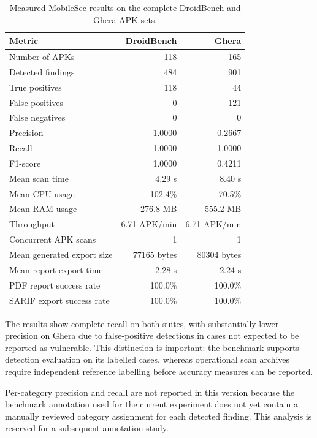 \begin{table}[!htbp]
\centering
\caption{Measured MobileSec results on the complete DroidBench and Ghera APK sets.}
\label{tab:mobilesec-benchmark-realworld-generated}
\begin{tabular}{lrr}
\toprule
\textbf{Metric} & \textbf{DroidBench} & \textbf{Ghera} \\
\midrule
Number of APKs & 118 & 165 \\
Detected findings & 484 & 901 \\
True positives & 118 & 44 \\
False positives & 0 & 121 \\
False negatives & 0 & 0 \\
Precision & 1.0000 & 0.2667 \\
Recall & 1.0000 & 1.0000 \\
F1-score & 1.0000 & 0.4211 \\
Mean scan time & 4.29 s & 8.40 s \\
Mean CPU usage & 102.4\% & 70.5\% \\
Mean RAM usage & 276.8 MB & 555.2 MB \\
Throughput & 6.71 APK/min & 6.71 APK/min \\
Concurrent APK scans & 1 & 1 \\
Mean generated export size & 77165 bytes & 80304 bytes \\
Mean report-export time & 2.28 s & 2.24 s \\
PDF report success rate & 100.0\% & 100.0\% \\
SARIF export success rate & 100.0\% & 100.0\% \\
\bottomrule
\end{tabular}
\end{table}

The results show complete recall on both suites, with substantially lower
precision on Ghera due to false-positive detections in cases not expected to
be reported as vulnerable. This distinction is important: the benchmark
supports detection evaluation on its labelled cases, whereas operational scan
archives require independent reference labelling before accuracy measures can
be reported.

Per-category precision and recall are not reported in this version because the
benchmark annotation used for the current experiment does not yet contain a
manually reviewed category assignment for each detected finding. This analysis
is reserved for a subsequent annotation study.

